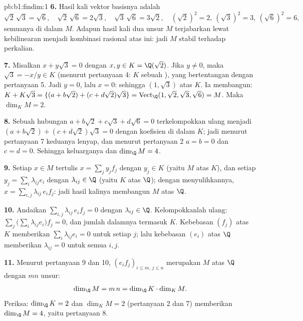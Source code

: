 \begin{solution}{pb:b1:findim:1}
\textbf{6.} Hasil kali vektor basisnya adalah
\[
\sqrt2\,\sqrt3 = \sqrt6,\quad
\sqrt2\,\sqrt6 = 2\sqrt3,\quad
\sqrt3\,\sqrt6 = 3\sqrt2,\quad
(\sqrt2)^2 = 2,\ (\sqrt3)^2 = 3,\ (\sqrt6)^2 = 6,
\]
semuanya di dalam $M$. Adapun hasil kali dua unsur $M$ terjabarkan lewat
kebilinearan menjadi kombinasi rasional atas ini: jadi $M$ stabil
terhadap perkalian.

\textbf{7.} Misalkan $x + y\sqrt3 = 0$ dengan $x, y \in K = \Q(\sqrt2)$.
Jika $y \neq 0$, maka $\sqrt3 = -x/y \in K$ (menurut pertanyaan 4: $K$ sebuah
), yang bertentangan dengan pertanyaan 5. Jadi $y = 0$, lalu $x = 0$: sehingga $(1,
\sqrt3)$  atas $K$. Ia membangun: $K + K\sqrt3 =
\{(a + b\sqrt2) + (c + d\sqrt2)\sqrt3\} = \operatorname{Vect}_\Q
(1, \sqrt2, \sqrt3, \sqrt6) = M$. Maka $\dim_K M = 2$.

\textbf{8.} Sebuah hubungan $a + b\sqrt2 + c\sqrt3 + d\sqrt6 = 0$
terkelompokkan ulang menjadi $(a + b\sqrt2) + (c + d\sqrt2)\sqrt3 = 0$ dengan
koefisien di dalam $K$; jadi menurut pertanyaan 7 keduanya lenyap, dan menurut pertanyaan 2
$a = b = 0$ dan $c = d = 0$. Sehingga keluarganya  dan $\dim_\Q M
= 4$.

\textbf{9.} Setiap $x \in M$ tertulis $x = \sum_j y_j f_j$ dengan $y_j
\in K$ (yaitu  $M$ atas $K$), dan setiap $y_j = \sum_i
\lambda_{ij} e_i$ dengan $\lambda_{ij} \in \Q$ (yaitu  $K$ atas
$\Q$); dengan menyulihkannya, $x = \sum_{i,j} \lambda_{ij}\, e_i f_j$: jadi
hasil kalinya membangun $M$ atas $\Q$.

\textbf{10.} Andaikan $\sum_{i,j} \lambda_{ij}\, e_i f_j = 0$ dengan
$\lambda_{ij} \in \Q$. Kelompokkanlah ulang: $\sum_j \bigl(\sum_i \lambda_{ij}
e_i\bigr) f_j = 0$, dan jumlah dalamnya termasuk $K$. Kebebasan
$(f_j)$ atas $K$ memberikan $\sum_i \lambda_{ij} e_i = 0$ untuk setiap
$j$; lalu kebebasan $(e_i)$ atas $\Q$ memberikan $\lambda_{ij} = 0$
untuk semua $i, j$.

\textbf{11.} Menurut pertanyaan 9 dan 10, $(e_i f_j)_{i \leq m,\, j
\leq n}$ merupakan  $M$ atas $\Q$ dengan $mn$ unsur:
\[
\dim_\Q M = m\,n = \dim_\Q K \cdot \dim_K M .
\]
Periksa: $\dim_\Q K = 2$ dan $\dim_K M = 2$ (pertanyaan 2 dan 7)
memberikan $\dim_\Q M = 4$, yaitu pertanyaan 8.


\end{solution}

